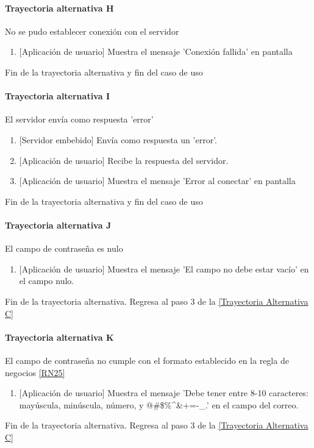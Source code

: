 \paragraph{Trayectoria alternativa H} \label{SUB-U-CU1.4:TH}
    No se pudo establecer conexión con el servidor
    \begin{enumerate}[label=D\arabic*.]
		\item {[Aplicación de usuario]} Muestra el mensaje 'Conexión fallida' en pantalla
	\end{enumerate}
	Fin de la trayectoria alternativa y fin del caso de uso

\paragraph{Trayectoria alternativa I} \label{SUB-U-CU1.4:TI}
    El servidor envía como respuesta 'error'
    \begin{enumerate}[label=D\arabic*.]
		\item {[Servidor embebido]} Envía como respuesta un 'error'.
		\item {[Aplicación de usuario]} Recibe la respuesta del servidor.
		\item {[Aplicación de usuario]} Muestra el mensaje 'Error al conectar' en pantalla
	\end{enumerate}
	Fin de la trayectoria alternativa y fin del caso de uso
	
\paragraph{Trayectoria alternativa J} \label{SUB-U-CU1.4:TJ}
    El campo de contraseña es nulo
    \begin{enumerate}[label=D\arabic*.]
		\item {[Aplicación de usuario]} Muestra el mensaje 'El campo no debe estar vacío' en el campo nulo.
	\end{enumerate}
	Fin de la trayectoria alternativa. Regresa al paso 3 de la \hyperref[SUB-U-CU1.4:TC]{[Trayectoria Alternativa C]}
	
\paragraph{Trayectoria alternativa K} \label{SUB-U-CU1.4:TK}
    El campo de contraseña no cumple con el formato establecido en la regla de negocios \ref{RN25}
    \begin{enumerate}[label=D\arabic*.]
		\item {[Aplicación de usuario]} Muestra el mensaje 'Debe tener entre 8-10 caracteres: mayúscula, minúscula, número, y @\#\$\%\textasciicircum{}\&+=-\_.' en el campo del correo.
	\end{enumerate}
	Fin de la trayectoria alternativa. Regresa al paso 3 de la \hyperref[SUB-U-CU1.4:TC]{[Trayectoria Alternativa C]}